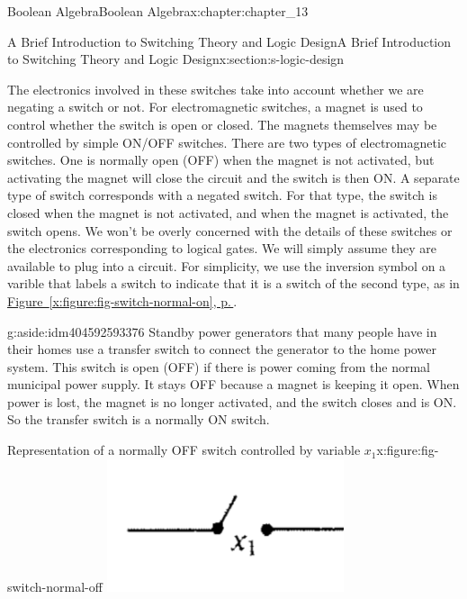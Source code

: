 \documentclass[twoside,10pt,]{book}
\newcommand{\xreffont}{\relax}
\numberwithin{equation}{section}
\begin{document}
\begin{chapterptx}{Boolean Algebra}{}{Boolean Algebra}{}{}{x:chapter:chapter_13}
\begin{sectionptx}{A Brief Introduction to Switching Theory and Logic Design}{}{A Brief Introduction to Switching Theory and Logic Design}{}{}{x:section:s-logic-design}
\par
The electronics involved in these switches take into account whether we are negating a switch or not.  For electromagnetic switches, a magnet is used to control whether the switch is open or closed. The magnets themselves may be controlled by simple ON\slash{}OFF switches.   There are two types of electromagnetic switches.  One is normally open (OFF) when the magnet is not activated, but activating the magnet  will close the circuit and the switch is then ON.  A separate type of switch corresponds with a negated switch. For that type, the switch is closed when the magnet is not activated, and when the magnet is activated, the switch opens.  We won't be overly concerned with the details of these switches or the electronics corresponding to logical gates.  We will simply assume they are available to plug into a circuit.    For simplicity, we use the inversion symbol on a varible that labels a switch to indicate that it is a switch of the second type, as in \hyperref[x:figure:fig-switch-normal-on]{Figure~{\xreffont\ref{x:figure:fig-switch-normal-on}}, p.\,\pageref{x:figure:fig-switch-normal-on}}.%
\begin{aside}{}{g:aside:idm404592593376}%
Standby power generators that many people have in their homes use a transfer switch to connect the generator to the home power system.  This switch is open (OFF) if there is power coming from the normal municipal power supply. It stays OFF because a magnet is keeping it open.  When power is lost, the magnet is no longer activated, and the switch closes and is ON. So the transfer switch is a normally ON switch.%
\end{aside}
\begin{sidebyside}{2}{0}{0}{0}%
\begin{sbspanel}{0.5}%
\begin{figureptx}{Representation of a normally OFF switch controlled by variable \(x_1\)}{x:figure:fig-switch-normal-off}{}%
\includegraphics[width=\linewidth]{images/fig-switch-normal-off.png}

\end{figureptx}
\end{sbspanel}
\end{sidebyside}
\end{sectionptx}
\end{chapterptx}
\end{document}
